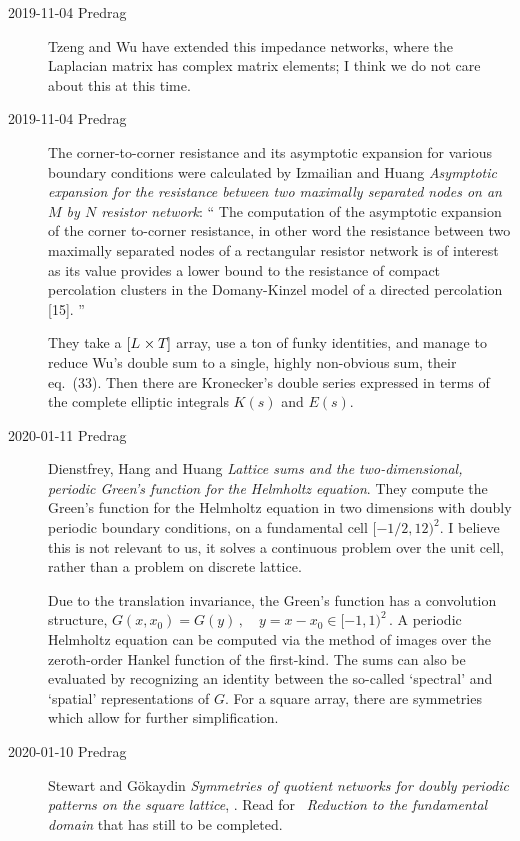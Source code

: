 \begin{description}
\item[2019-11-04 Predrag]
Tzeng and Wu have extended this impedance networks, where the
Laplacian matrix has complex matrix elements; I think we do not care
about this at this time.


\item[2019-11-04 Predrag]
The corner-to-corner resistance and its asymptotic expansion for various
boundary conditions were calculated by Izmailian and Huang
{\em Asymptotic expansion for the resistance between two maximally
separated nodes on an {$M$} by {$N$} resistor network}:
``
The computation of the asymptotic expansion of the corner to-corner
resistance, in other word the resistance between two maximally separated
nodes of a rectangular resistor network is of interest as its value
provides a lower bound to the resistance of compact percolation clusters
in the Domany-Kinzel model of a directed percolation [15]. ''

They take a $[{L_{}}\times{\ensuremath{T_{}}}]$ array, use a ton of funky
identities, and manage to reduce Wu's double sum  to a
single, highly non-obvious sum, their eq.~(33).
Then there are Kronecker's double series
expressed in terms of the complete elliptic integrals $K(s)$ and $E(s)$.

\item[2020-01-11 Predrag] Dienstfrey, Hang and Huang {\em
Lattice sums and the two-dimensional, periodic {Green's} function for the
{Helmholtz} equation}.
They compute the Green's function for the Helmholtz equation in two
dimensions with doubly periodic boundary conditions, on a fundamental
cell $[-1/2,12)^2$. I believe this is not relevant to us, it solves a
continuous problem over the unit cell, rather than a problem on discrete
lattice.

Due to the translation invariance, the Green's function has a convolution
structure,
\(
G(x,x_0)= G(y)
\,,\quad y=x-x_0
\in[-1,1)^2
\,.
\)
A periodic Helmholtz equation can be computed via the method of images
over the zeroth-order Hankel function of the first-kind. The sums can
also be evaluated by recognizing an identity between the so-called
`spectral' and `spatial' representations of $G$. For a square array,
there are symmetries which allow for further simplification.

\item[2020-01-10 Predrag]
Stewart and G{\"o}kaydin
{\em Symmetries of quotient networks for doubly periodic patterns on the
square lattice}, . Read for
~{\em Reduction to the fundamental domain} that has still
to be completed.


\end{description}
